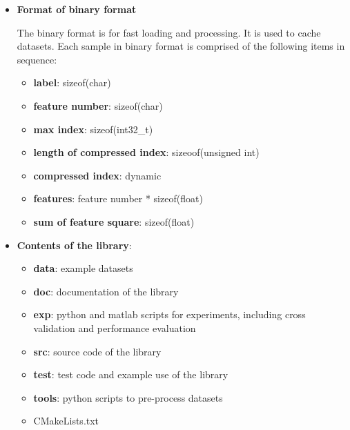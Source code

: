 \documentclass[11pt,a4paper]{article}
\newlength{\wideitemsep}
\let\olditem\item
\renewcommand{\item}{\setlength{\itemsep}{\wideitemsep}\olditem}
\begin{document}
\begin{itemize}
    \item \textbf{Format of binary format}

        The binary format is for fast loading and processing. It is used to cache
        datasets. Each sample in binary format is comprised of the following
        items in sequence:
        \begin{itemize}
            \item \textbf{label}: sizeof(char)
            \item \textbf{feature number}: sizeof(char)
            \item \textbf{max index}: sizeof(int32\_t)
            \item \textbf{length of compressed index}: sizeoof(unsigned int) 
            \item \textbf{compressed index}: dynamic 
            \item \textbf{features}: feature number * sizeof(float)
            \item \textbf{sum of feature square}: sizeof(float)
        \end{itemize}

    \item \textbf{Contents of the library}:

        \begin{itemize}
            \item   \textbf{data}: example datasets 
            \item   \textbf{doc}: documentation of the library
            \item   \textbf{exp}: python and matlab scripts for experiments, including cross validation and performance evaluation
            \item   \textbf{src}: source code of the library
            \item   \textbf{test}: test code and example use of the library
            \item   \textbf{tools}: python scripts to pre-process datasets
            \item   CMakeLists.txt
        \end{itemize}

\end{itemize}
\end{document}

